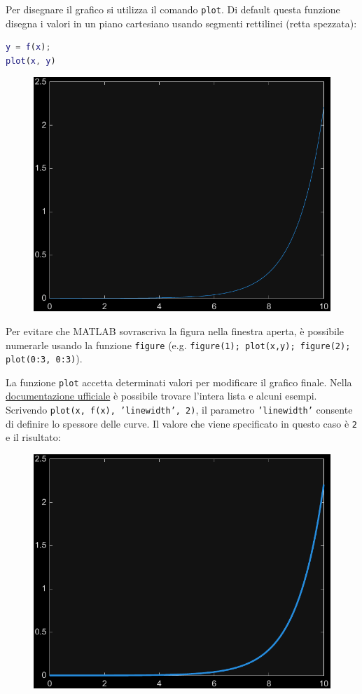 \newpage

\noindent
{}

\highspace
Per disegnare il grafico si utilizza il comando \texttt{plot}. Di default questa funzione disegna i valori in un piano cartesiano usando segmenti rettilinei (retta spezzata):
\begin{lstlisting}[language=MATLAB]
y = f(x);
plot(x, y)\end{lstlisting}
\begin{figure}[!htp]
    \centering
    \includegraphics[width=.6\textwidth]{img/grafici-di-funzione-1.pdf}
\end{figure}

\noindent
Per evitare che MATLAB sovrascriva la figura nella finestra aperta, è possibile numerarle usando la funzione \texttt{figure} (e.g. \texttt{figure(1); plot(x,y); figure(2); plot(0:3, 0:3)}).

\highspace
La funzione \texttt{plot} accetta determinati valori per modificare il grafico finale. Nella \href{https://it.mathworks.com/help/releases/R2024a/matlab/ref/plot.html}{documentazione ufficiale} è possibile trovare l'intera lista e alcuni esempi. Scrivendo \texttt{plot(x, f(x), 'linewidth', 2)}, il parametro \texttt{'linewidth'} consente di definire lo spessore delle curve. Il valore che viene specificato in questo caso è \texttt{2} e il risultato:
\begin{figure}[!htp]
    \centering
    \includegraphics[width=.6\textwidth]{img/grafici-di-funzione-2.pdf}
\end{figure}

